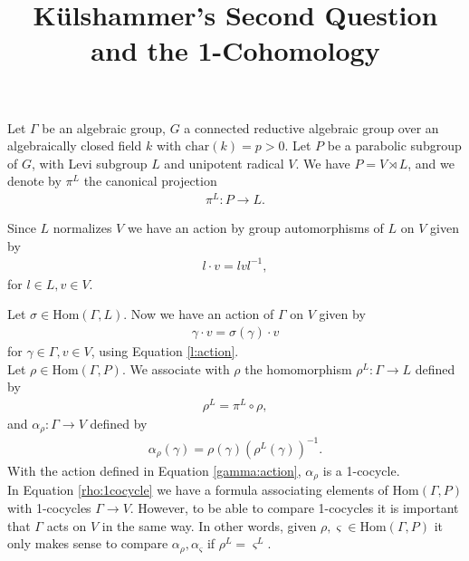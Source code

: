 \documentclass[12pt, a4paper]{amsart}
\numberwithin{equation}{section}
\theoremstyle{definition}
\theoremstyle{remark}
\theoremstyle{remark}
\begin{document}
\title{K\"ulshammer's Second Question and the 1-Cohomology}

\maketitle

Let $\Gamma$ be an algebraic group, $G$ a connected reductive algebraic group over an algebraically closed field $k$ with $\mathrm{char}(k) = p > 0$.
Let $P$ be a parabolic subgroup of $G$, with Levi subgroup $L$ and unipotent radical $V$.  
We have $P = V \rtimes L$, and we denote by $\pi^L$ the canonical projection
\begin{eqnarray}
	\pi^L: P \rightarrow L.
\end{eqnarray}

Since $L$ normalizes $V$ we have an action by group automorphisms of $L$ on $V$ given by
\begin{eqnarray} \label{l:action} l \cdot v = lvl^{-1}, \end{eqnarray}
for $l \in L, v \in V$.

Let $\sigma \in \mathrm{Hom}(\Gamma, L)$. Now we have an action of $\Gamma$ on $V$ given by
\begin{eqnarray} \label{gamma:action} \gamma \cdot v = \sigma(\gamma) \cdot v \end{eqnarray}
for $\gamma \in \Gamma, v \in V$, using Equation \ref{l:action}. \\

Let $\rho \in \mathrm{Hom}(\Gamma, P)$. We associate with $\rho$ the homomorphism $\rho^L:\Gamma \rightarrow L$ defined by
\begin{eqnarray} \rho^L = \pi^L \circ \rho, \end{eqnarray} and $\alpha_\rho:\Gamma \rightarrow V$ defined by
\begin{eqnarray} \label{rho:1cocycle}
	\alpha_\rho(\gamma) = \rho(\gamma)(\rho^L(\gamma))^{-1}.
\end{eqnarray}
With the action defined in Equation \ref{gamma:action}, $\alpha_\rho$ is a 1-cocycle. \\


In Equation \ref{rho:1cocycle} we have a formula associating elements of $\mathrm{Hom}(\Gamma, P)$ with 1-cocycles $\Gamma\rightarrow V$. However, to be able to compare 1-cocycles it is important that $\Gamma$ acts on $V$ in the same way. In other words, given $\rho, \varsigma \in \mathrm{Hom}(\Gamma, P)$ it only makes sense to compare $\alpha_{\rho}, \alpha_{\varsigma}$ if $\rho^L = \varsigma^L$. 
\end{document}
